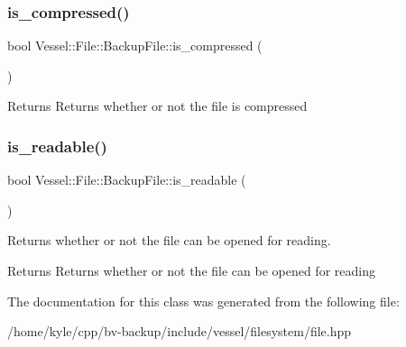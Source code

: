 \subsubsection{\texorpdfstring{is\+\_\+compressed()}{is\_compressed()}}
{\footnotesize\ttfamily bool Vessel\+::\+File\+::\+Backup\+File\+::is\+\_\+compressed (\begin{DoxyParamCaption}{ }\end{DoxyParamCaption})}

\begin{DoxyReturn}{Returns}
Returns whether or not the file is compressed 
\end{DoxyReturn}
\mbox{\label{class_vessel_1_1_file_1_1_backup_file_aca36a170c08cb07d83babdb7a0476a15}} 
\subsubsection{\texorpdfstring{is\+\_\+readable()}{is\_readable()}}
{\footnotesize\ttfamily bool Vessel\+::\+File\+::\+Backup\+File\+::is\+\_\+readable (\begin{DoxyParamCaption}{ }\end{DoxyParamCaption})}



Returns whether or not the file can be opened for reading. 

\begin{DoxyReturn}{Returns}
Returns whether or not the file can be opened for reading 
\end{DoxyReturn}


The documentation for this class was generated from the following file\+:\begin{DoxyCompactItemize}
\item 
/home/kyle/cpp/bv-\/backup/include/vessel/filesystem/file.\+hpp\end{DoxyCompactItemize}
